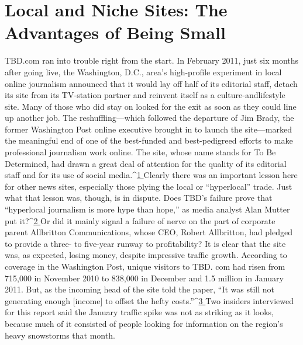 
\chapter{Local and Niche Sites: The Advantages of Being Small}
TBD.com ran into trouble right from the start. In February 2011, just six
months after going live, the Washington, D.C., area’s high-profile experiment in
local online journalism announced that it would lay off half of its editorial staff,
detach its site from its TV-station partner and reinvent itself as a culture-andlifestyle
site. Many of those who did stay on looked for the exit as soon as they
could line up another job.
The reshuffling—which followed the departure of Jim Brady, the former
Washington Post online executive brought in to launch the site—marked the
meaningful end of one of the best-funded and best-pedigreed efforts to make
professional journalism work online. The site, whose name stands for To Be Determined,
had drawn a great deal of attention for the quality of its editorial staff
and for its use of social media.^{\href{#endnotes-ch3}{1 }}Clearly there was an important lesson here for
other news sites, especially those plying the local or ``hyperlocal'' trade.
Just what that lesson was, though, is in dispute. Does TBD’s failure prove that
``hyperlocal journalism is more hype than hope,'' as media analyst Alan Mutter
put it?^{\href{#endnotes-ch3}{2 }}Or did it mainly signal a failure of nerve on the part of corporate parent
Allbritton Communications, whose CEO, Robert Allbritton, had pledged to
provide a three- to five-year runway to profitability?
It is clear that the site was, as expected, losing money, despite impressive traffic
growth. According to coverage in the Washington Post, unique visitors to TBD.
com had risen from 715,000 in November 2010 to 838,000 in December and
1.5 million in January 2011. But, as the incoming head of the site told the paper,
``It was still not generating enough [income] to offset the hefty costs.''^{\href{#endnotes-ch3}{3 }}Two insiders
interviewed for this report said the January traffic spike was not as striking
as it looks, because much of it consisted of people looking for information on the
region’s heavy snowstorms that month.

